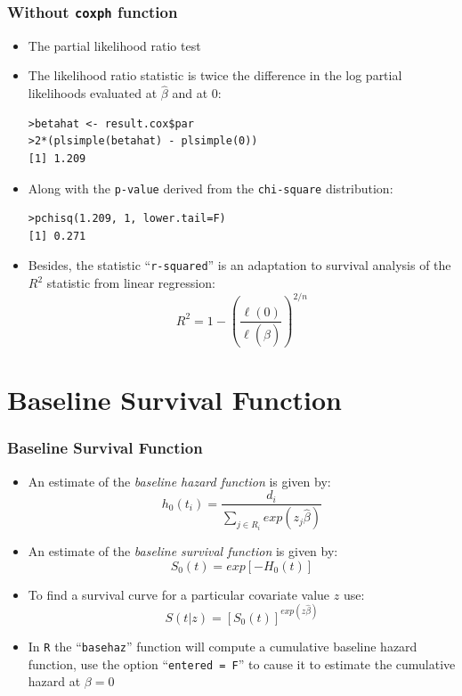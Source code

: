 \documentclass{beamer}
\newcommand{\empr}[1]{{\emph{\color{red}#1}}}
\begin{document}
\pagebreak
\begin{frame}[fragile]
\frametitle{Without \texttt{coxph} function}
\begin{itemize}
\item The partial likelihood ratio test
\item The likelihood ratio statistic is twice the difference in the log partial likelihoods evaluated at $\hat{\beta}$ and at 0:
\begin{Verbatim}
>betahat <- result.cox$par
>2*(plsimple(betahat) - plsimple(0))
[1] 1.209
\end{Verbatim}
\item Along with the \texttt{p-value} derived from the \texttt{chi-square} distribution:
\begin{Verbatim}
>pchisq(1.209, 1, lower.tail=F)
[1] 0.271
\end{Verbatim}
\item Besides, the statistic ``\texttt{r-squared}'' is an adaptation to survival analysis of the $R^2$ statistic from linear regression:
\begin{equation}
R^2 = 1 - (\frac{\ell(0)}{\ell(\hat{\beta})})^{2/n}  
\end{equation}
\end{itemize}
\end{frame}

\section{Baseline Survival Function}
\begin{frame}
\frametitle{Baseline Survival Function}
\begin{itemize}
\item An estimate of the \empr{baseline hazard function} is given by:
\begin{equation}
h_0(t_i) = \frac{d_i}{\sum\limits_{j\in R_i}{} exp(z_j\hat{\beta})}
\end{equation}
\item An estimate of the \empr{baseline survival function} is given by:
\begin{equation}
S_0(t) = exp[-H_0(t)]
\end{equation}
\item To find a survival curve for a particular covariate value $z$ use:
\begin{equation}
S(t|z) = [S_0(t)]^{exp(z\hat{\beta})}
\end{equation}
\item In \texttt{R} the ``\texttt{basehaz}'' function will compute a cumulative baseline hazard function, use the option ``\texttt{entered = F}'' to cause it to estimate the cumulative hazard at $\beta = 0$
\end{itemize}
\end{frame}
\end{document}

